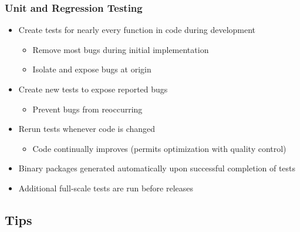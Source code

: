 \documentclass{beamer}
\begin{document}
\begin{frame}
  \frametitle{Unit and Regression Testing}

  \begin{itemize}
  \item Create tests for nearly every function in code during development
    \begin{itemize}
    \item Remove most bugs during initial implementation
    \item Isolate and expose bugs at origin
    \end{itemize}
  \item Create new tests to expose reported bugs
    \begin{itemize}
    \item Prevent bugs from reoccurring
    \end{itemize}
  \item Rerun tests whenever code is changed
    \begin{itemize}
    \item Code continually improves (permits optimization with
      quality control)
    \end{itemize}
  \item Binary packages generated automatically upon successful
    completion of tests
  \item Additional full-scale tests are run before releases
  \end{itemize}

\end{frame}


\subsection{Tips}
\end{document}
